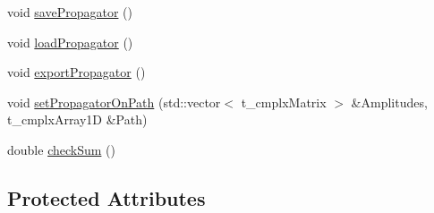 \begin{DoxyCompactItemize}
void \hyperlink{class_c___quark_a53d6cb2219f3a6deb67e6ba85aba8f92}{save\-Propagator} ()
\item 
void \hyperlink{class_c___quark_afff9ac6d9f21b6d3656c1a0e380f9327}{load\-Propagator} ()
\item 
void \hyperlink{class_c___quark_a998f5c9e3ee4920aae7f86e2b1e0c179}{export\-Propagator} ()
\item 
void \hyperlink{class_c___quark_aa1a0d2d4817feb9a53ee3d14754586d7}{set\-Propagator\-On\-Path} (std\-::vector$<$ t\-\_\-cmplx\-Matrix $>$ \&Amplitudes, t\-\_\-cmplx\-Array1\-D \&Path)
\item 
double \hyperlink{class_c___quark_a044cb5ab7b63cca9d4d18792634f5bf1}{check\-Sum} ()
\end{DoxyCompactItemize}
\subsection*{Protected Attributes}
